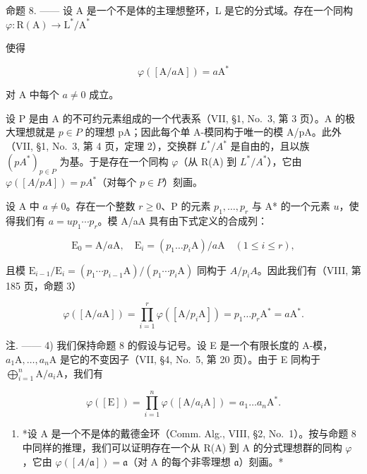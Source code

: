 命题 8. —— 设 A 是一个不是体的主理想整环，L 是它的分式域。存在一个同构 \(\varphi : \mathrm{R}(\mathrm{A}) \to \mathrm{L}^{*}/\mathrm{A}^{*}\)

使得

\[
\varphi ([ \mathrm{A} / a \mathrm{A} ]) = a \mathrm{A} ^ {*}\tag{9}
\]

对 A 中每个 \(a \neq 0\) 成立。

设 P 是由 A 的不可约元素组成的一个代表系（VII, §1, No.~3, 第 3 页）。A 的极大理想就是 \(p \in P\) 的理想 pA；因此每个单 A-模同构于唯一的模 A/pA。此外（VII, §1, No.~3, 第 4 页，定理 2），交换群 \(L^{*}/A^{*}\) 是自由的，且以族 \((pA^{*})_{p \in P}\) 为基。于是存在一个同构 \(\varphi\)（从 R(A) 到 \(L^{*}/A^{*}\)），它由 \(\varphi([A/pA]) = pA^{*}\)（对每个 \(p \in P\)）刻画。

设 A 中 \(a \neq 0\)。存在一个整数 \(r \geqslant 0\)、P 的元素 \(p_1, \ldots, p_r\) 与 A* 的一个元素 \(u\)，使得我们有 \(a = up_1 \cdots p_r\)。模 A/aA 具有由下式定义的合成列：

\[
\mathrm{E} _ {0} = \mathrm{A} / a \mathrm{A}, \quad \mathrm{E} _ {i} = (p _ {1} \dots p _ {i} \mathrm{A}) / a \mathrm{A} \quad (1 \leqslant i \leqslant r),
\]

且模 \(\mathrm{E}_{i-1}/\mathrm{E}_{i}=(p_{1}\cdots p_{i-1}\mathrm{A})/(p_{1}\cdots p_{i}\mathrm{A})\) 同构于 \(A/p_{i}A\)。因此我们有（VIII, 第 185 页，命题 3）

\[
\varphi ([ \mathrm{A} / a \mathrm{A} ]) = \prod_ {i = 1} ^ {r} \varphi ([ \mathrm{A} / p _ {i} \mathrm{A} ]) = p _ {1} \dots p _ {r} \mathrm{A} ^ {*} = a \mathrm{A} ^ {*}.
\]

注. —— 4) 我们保持命题 8 的假设与记号。设 E 是一个有限长度的 A-模，\(a_{1}\mathrm{A},\ldots ,a_{n}\mathrm{A}\) 是它的不变因子（VII, §4, No.~5, 第 20 页）。由于 E 同构于 \(\bigoplus_{i = 1}^{n}\mathrm{A} / a_i\mathrm{A}\)，我们有

\[
\varphi ([ \mathrm{E} ]) = \prod_ {i = 1} ^ {n} \varphi ([ \mathrm{A} / a _ {i} \mathrm{A} ]) = a _ {1} \dots a _ {n} \mathrm{A} ^ {*}.\tag{10}
\]

\begin{enumerate}
\def\labelenumi{\arabic{enumi})}
\setcounter{enumi}{4}
\tightlist
\item
  *设 A 是一个不是体的戴德金环（Comm. Alg., VIII, §2, No.~1）。按与命题 8 中同样的推理，我们可以证明存在一个从 R(A) 到 A 的分式理想群的同构 \(\varphi\)，它由 \(\varphi([A/\mathfrak{a}]) = \mathfrak{a}\)（对 A 的每个非零理想 \(\mathfrak{a}\)）刻画。*
\end{enumerate}

